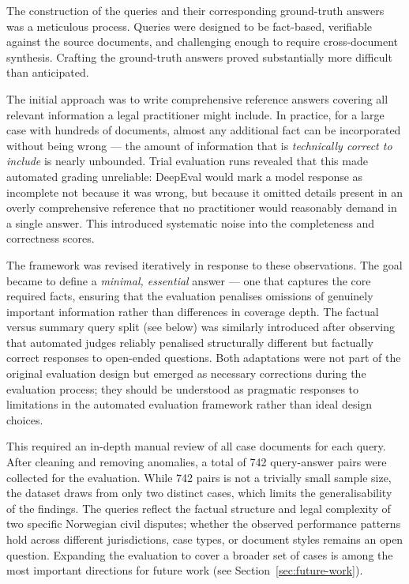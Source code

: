 The construction of the queries and their corresponding ground-truth answers was a meticulous process. Queries were designed to be fact-based, verifiable against the source documents, and challenging enough to require cross-document synthesis. Crafting the ground-truth answers proved substantially more difficult than anticipated.

The initial approach was to write comprehensive reference answers covering all relevant information a legal practitioner might include. In practice, for a large case with hundreds of documents, almost any additional fact can be incorporated without being wrong --- the amount of information that is \emph{technically correct to include} is nearly unbounded. Trial evaluation runs revealed that this made automated grading unreliable: DeepEval would mark a model response as incomplete not because it was wrong, but because it omitted details present in an overly comprehensive reference that no practitioner would reasonably demand in a single answer. This introduced systematic noise into the completeness and correctness scores.

The framework was revised iteratively in response to these observations. The goal became to define a \emph{minimal, essential} answer --- one that captures the core required facts, ensuring that the evaluation penalises omissions of genuinely important information rather than differences in coverage depth. The factual versus summary query split (see below) was similarly introduced after observing that automated judges reliably penalised structurally different but factually correct responses to open-ended questions. Both adaptations were not part of the original evaluation design but emerged as necessary corrections during the evaluation process; they should be understood as pragmatic responses to limitations in the automated evaluation framework rather than ideal design choices.

This required an in-depth manual review of all case documents for each query. After cleaning and removing anomalies, a total of 742 query-answer pairs were collected for the evaluation. While 742 pairs is not a trivially small sample size, the dataset draws from only two distinct cases, which limits the generalisability of the findings. The queries reflect the factual structure and legal complexity of two specific Norwegian civil disputes; whether the observed performance patterns hold across different jurisdictions, case types, or document styles remains an open question. Expanding the evaluation to cover a broader set of cases is among the most important directions for future work (see Section~\ref{sec:future-work}).

